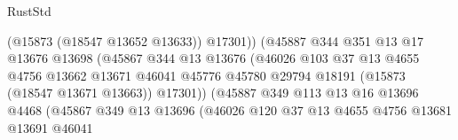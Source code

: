 \begin{lexlean}{RustStd}
\begin{coremodule}
                                              (@15873 (@18547 @13652 @13633))
                                              @17301))
                                          (@45887
                                            @344
                                            @351
                                            @13
                                            @17
                                            @13676
                                            @13698
                                            (@45867
                                              @344
                                              @13
                                              @13676
                                              (@46026
                                                @103
                                                @37
                                                @13
                                                @4655
                                                @4756
                                                @13662
                                                @13671
                                                @46041
                                                @45776
                                                @45780
                                                @29794
                                                @18191
                                                (@15873 (@18547 @13671 @13663))
                                                @17301))
                                            (@45887
                                              @349
                                              @113
                                              @13
                                              @16
                                              @13696
                                              @4468
                                              (@45867
                                                @349
                                                @13
                                                @13696
                                                (@46026
                                                  @120
                                                  @37
                                                  @13
                                                  @4655
                                                  @4756
                                                  @13681
                                                  @13691
                                                  @46041

\end{coremodule}
\end{lexlean}

